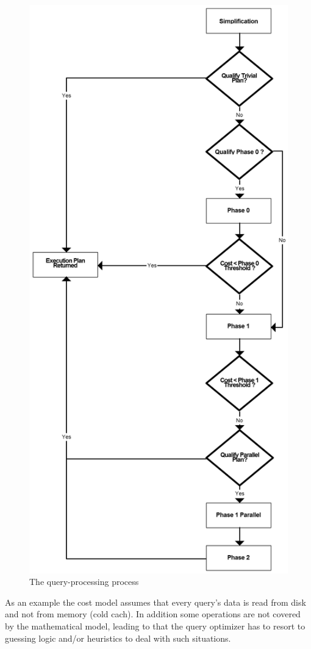 \documentclass{cslthse-msc}
\begin{document}
\begin{figure}[H] 
\begin{center}
    \includegraphics[scale=0.3]{Optimization-process.png}
  \end{center}
  \vspace{-20pt}
  \caption{The query-processing process}
  \label{fig:qpp}
  \vspace{-10pt}
\end{figure} 
\noindent As an example the cost model assumes that every query's data is read from disk and not from memory (cold cach). In addition some operations are not covered by the mathematical model, leading to that the query optimizer has to resort to guessing logic and/or heuristics to deal with such situations. 
\end{document}
